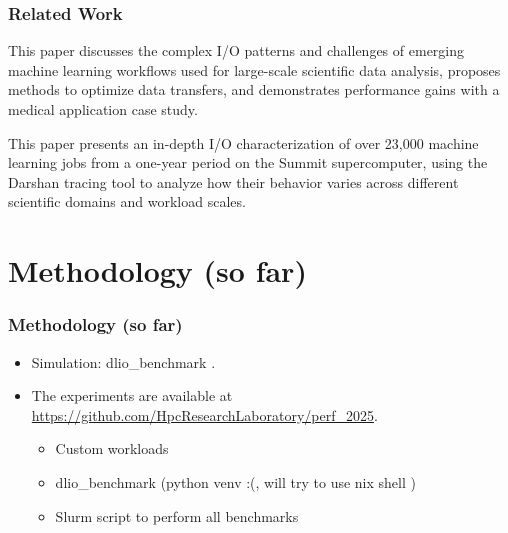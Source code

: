 \documentclass[brazil, bsc, 10pt]{beamer}
\begin{document}
\begin{frame}
	\frametitle{Related Work}
	\begin{block}{}
		This paper discusses the complex I/O patterns and challenges of emerging machine learning workflows used for large-scale scientific data analysis, proposes methods to optimize data transfers, and demonstrates performance gains with a medical application case study.
	\end{block}

	\begin{block}{}
		This paper presents an in-depth I/O characterization of over 23,000 machine learning jobs from a one-year period on the Summit supercomputer, using the Darshan tracing tool to analyze how their behavior varies across different scientific domains and workload scales.
	\end{block}
\end{frame}

\section{Methodology (so far)}

\begin{frame}
	\frametitle{Methodology (so far)}
	\begin{block}{}
		\begin{itemize}
			\item Simulation: dlio\_benchmark \cite{dlio_benchmark}.
			\item The experiments are available at \url{https://github.com/HpcResearchLaboratory/perf_2025}.
			      \begin{itemize}
				      \item Custom workloads
				      \item dlio\_benchmark (python venv :(, will try to use nix shell )
				      \item Slurm script to perform all benchmarks
			      \end{itemize}
		\end{itemize}
	\end{block}
\end{frame}
\end{document}
